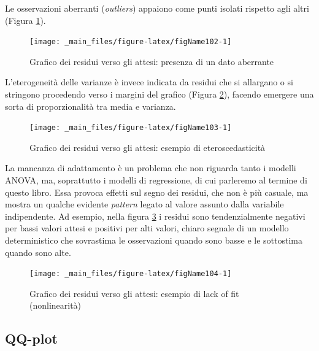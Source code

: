 \documentclass[a4paper,12pt,oneside]{book}
\begin{document}
Le osservazioni aberranti (\emph{outliers}) appaiono come punti isolati rispetto agli altri (Figura \ref{fig:figName102}).

\begin{figure}

{\centering \texttt{[image: \_main\_files/figure-latex/figName102-1]} 

}

\caption{Grafico dei residui verso gli attesi: presenza di un dato aberrante}\label{fig:figName102}
\end{figure}

L'eterogeneità delle varianze è invece indicata da residui che si allargano o si stringono procedendo verso i margini del grafico (Figura \ref{fig:figName103}), facendo emergere una sorta di proporzionalità tra media e varianza.

\begin{figure}

{\centering \texttt{[image: \_main\_files/figure-latex/figName103-1]} 

}

\caption{Grafico dei residui verso gli attesi: esempio di eteroscedasticità}\label{fig:figName103}
\end{figure}

La mancanza di adattamento è un problema che non riguarda tanto i modelli ANOVA, ma, soprattutto i modelli di regressione, di cui parleremo al termine di questo libro. Essa provoca effetti sul segno dei residui, che non è più casuale, ma mostra un qualche evidente \emph{pattern} legato al valore assunto dalla variabile indipendente. Ad esempio, nella figura \ref{fig:figName104} i residui sono tendenzialmente negativi per bassi valori attesi e positivi per alti valori, chiaro segnale di un modello deterministico che sovrastima le osservazioni quando sono basse e le sottostima quando sono alte.

\begin{figure}

{\centering \texttt{[image: \_main\_files/figure-latex/figName104-1]} 

}

\caption{Grafico dei residui verso gli attesi: esempio di lack of fit (nonlinearità)}\label{fig:figName104}
\end{figure}

\hypertarget{qq-plot}{%
\subsection{QQ-plot}\label{qq-plot}}
\end{document}

